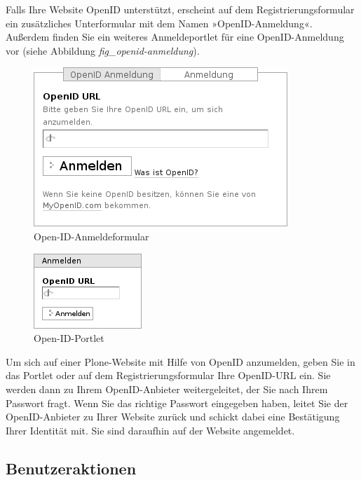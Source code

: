 \documentclass[a4paper,12pt,ngerman]{manual}
\begin{document}
Falls Ihre Website OpenID unterstützt, erscheint auf dem
Registrierungsformular ein zusätzliches Unterformular mit dem Namen
»OpenID-Anmeldung«. Außerdem finden Sie ein weiteres Anmeldeportlet für eine
OpenID-Anmeldung vor (siehe Abbildung \emph{fig\_openid-anmeldung}).
\hypertarget{fig-openid-anmeldung}{}\begin{figure}[htbp]
\centering

\includegraphics{openid-registrierungsformular.png}
\caption{Open-ID-Anmeldeformular}\end{figure}
\begin{figure}[htbp]
\centering

\includegraphics{openid-portlet.png}
\caption{Open-ID-Portlet}\end{figure}

Um sich auf einer Plone-Website mit Hilfe von OpenID anzumelden, geben Sie in
das Portlet oder auf dem Registrierungsformular Ihre OpenID-URL ein. Sie
werden dann zu Ihrem OpenID-Anbieter weitergeleitet, der Sie nach
Ihrem Passwort fragt. Wenn Sie das richtige Passwort eingegeben haben, leitet
Sie der OpenID-Anbieter zu Ihrer Website zurück und schickt dabei eine
Bestätigung Ihrer Identität mit. Sie sind daraufhin auf der Website angemeldet.
\hypertarget{sec-benutzer-aktionen}{}

\subsection{Benutzeraktionen}
\end{document}
